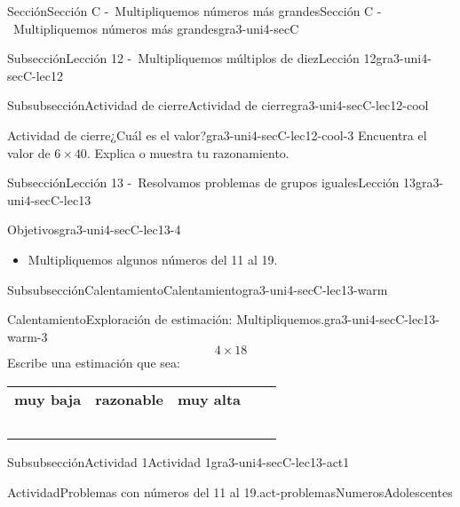 \documentclass[twoside,14pt,]{extarticle}
\newcommand{\tabularfont}{\relax}
\newcommand{\hrulethin}  {\noalign{\hrule height 0.04em}}
\begin{document}
\begin{sectionptx}{Sección}{Sección C -~Multipliquemos números más grandes}{}{Sección C -~Multipliquemos números más grandes}{}{}{gra3-uni4-secC}
\begin{subsectionptx}{Subsección}{Lección 12 -~Multipliquemos múltiplos de diez}{}{Lección 12}{}{}{gra3-uni4-secC-lec12}
\begin{subsubsectionptx}{Subsubsección}{Actividad de cierre}{}{Actividad de cierre}{}{}{gra3-uni4-secC-lec12-cool}
\begin{project}{Actividad de cierre}{¿Cuál es el valor?}{gra3-uni4-secC-lec12-cool-3}%
Encuentra el valor de \(6\times 40\). Explica o muestra tu razonamiento.%
\end{project}%
\end{subsubsectionptx}
\end{subsectionptx}
%
%
\typeout{************************************************}
\typeout{************************************************}
%
\begin{subsectionptx}{Subsección}{Lección 13 -~Resolvamos problemas de grupos iguales}{}{Lección 13}{}{}{gra3-uni4-secC-lec13}
\begin{objectives}{Objetivos}{gra3-uni4-secC-lec13-4}
%
\begin{itemize}[label=\textbullet]
\item{}Multipliquemos algunos números del 11 al 19.%
\end{itemize}
\end{objectives}
%
%
\typeout{************************************************}
\typeout{************************************************}
%
\begin{subsubsectionptx}{Subsubsección}{Calentamiento}{}{Calentamiento}{}{}{gra3-uni4-secC-lec13-warm}
\begin{exploration}{Calentamiento}{Exploración de estimación: Multipliquemos.}{gra3-uni4-secC-lec13-warm-3}%
%
\begin{equation*}
4\times 18
\end{equation*}
Escribe una estimación que sea:%
\begin{center}%
{\tabularfont%
\begin{tabular}{lAlAl}
{\bfseries{}muy baja}&{\bfseries{}razonable}&{\bfseries{}muy alta}\tabularnewline\hrulethin
~&~&~
\end{tabular}
}%
\end{center}%
\end{exploration}%
\end{subsubsectionptx}
%
%
\typeout{************************************************}
\typeout{************************************************}
%
\begin{subsubsectionptx}{Subsubsección}{Actividad 1}{}{Actividad 1}{}{}{gra3-uni4-secC-lec13-act1}
\begin{activity}{Actividad}{Problemas con números del 11 al 19.}{act-problemasNumerosAdolescentes}%

\end{activity}
\end{subsubsectionptx}
\end{subsectionptx}
\end{sectionptx}
\end{document}
